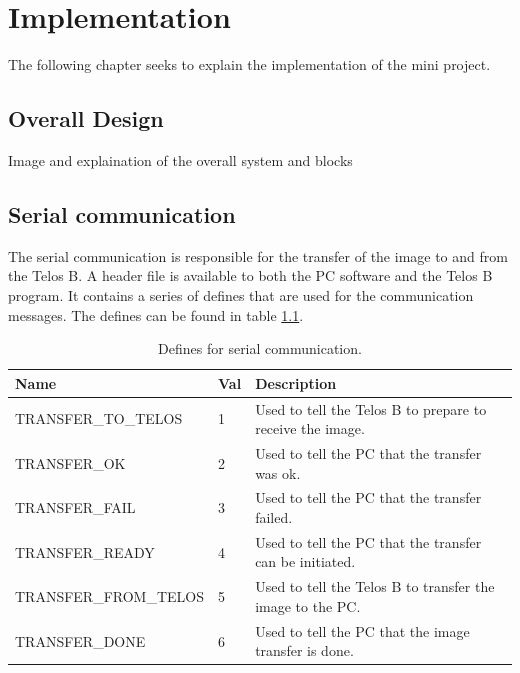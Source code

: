 \chapter{Implementation}
The following chapter seeks to explain the implementation of the mini project.\\

\section{Overall Design}
Image and explaination of the overall system and blocks\\

\section{Serial communication}
The serial communication is responsible for the transfer of the image to and from the Telos B. A header file is available to both the PC software and the Telos B program. It contains a series of defines that are used for the communication messages. The defines can be found in table \ref{definetable}.
\begin{table}[H]
    \begin{tabular}{|l|l|l|}
    \hline
    Name                  & Val & Description                                               \\ \hline
    TRANSFER\_TO\_TELOS   & 1     & Used to tell the Telos B to prepare to receive the image. \\ \hline
    TRANSFER\_OK          & 2     & Used to tell the PC that the transfer was ok.             \\ \hline
    TRANSFER\_FAIL        & 3     & Used to tell the PC that the transfer failed.             \\ \hline
    TRANSFER\_READY       & 4     & Used to tell the PC that the transfer can be initiated.   \\ \hline
    TRANSFER\_FROM\_TELOS & 5     & Used to tell the Telos B to transfer the image to the PC.  \\ \hline
    TRANSFER\_DONE        & 6     & Used to tell the PC that the image transfer is done.      \\ \hline
    \end{tabular}
    \caption{Defines for serial communication.}
    \label{definetable}
\end{table}
